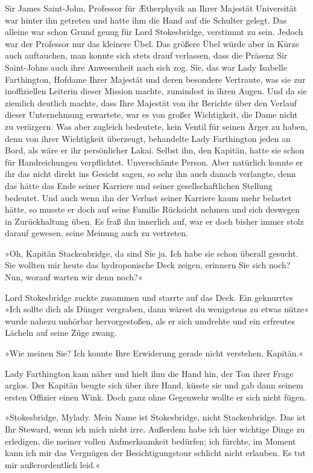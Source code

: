 Sir James Saint-John, Professor für Ætherphysik an Ihrer Majestät
Universität war hinter ihn getreten und hatte ihm die Hand auf die
Schulter gelegt. Das alleine war schon Grund genug für Lord
Stokesbridge, verstimmt zu sein. Jedoch war der Professor nur das
kleinere Übel. Das größere Übel würde aber in Kürze auch
auftauchen, man konnte sich stets drauf verlassen, dass die Präsenz
Sir Saint-Johns auch ihre Anwesenheit nach sich zog. Sie, das war
Lady Isabelle Farthington, Hofdame Ihrer Majestät und deren
besondere Vertraute, was sie zur inoffiziellen Leiterin dieser
Mission machte, zumindest in ihren Augen. Und da sie ziemlich
deutlich machte, dass Ihre Majestät von ihr Berichte über den
Verlauf dieser Unternehmung erwartete, war es von großer
Wichtigkeit, die Dame nicht zu verärgern. Was aber zugleich
bedeutete, kein Ventil für seinen Ärger zu haben, denn von ihrer
Wichtigkeit überzeugt, behandelte Lady Farthington jeden an Bord,
als wäre er ihr persönlicher Lakai. Selbst ihn, den Kapitän, hatte
sie schon für Handreichungen verpflichtet. Unverschämte Person.
Aber natürlich konnte er ihr das nicht direkt ins Gesicht sagen, so
sehr ihn auch danach verlangte, denn das hätte das Ende seiner
Karriere und seiner gesellschaftlichen Stellung bedeutet. Und auch
wenn ihn der Verlust seiner Karriere kaum mehr belastet hätte, so
musste er doch auf seine Familie Rücksicht nehmen und sich deswegen
in Zurückhaltung üben. Es fraß ihn innerlich auf, war er doch
bisher immer stolz darauf gewesen, seine Meinung auch zu
vertreten.

\bigpar

»Oh, Kapitän Stackenbridge, da sind Sie ja. Ich habe sie schon
überall gesucht. Sie wollten mir heute das hydroponische Deck
zeigen, erinnern Sie sich noch? Nun, worauf warten wir denn noch?«

Lord Stokesbridge zuckte zusammen und starrte auf das Deck. Ein
geknurrtes »Ich sollte dich als Dünger vergraben, dann wärest du
wenigstens zu etwas nütze« wurde nahezu unhörbar hervorgestoßen,
als er sich umdrehte und ein erfreutes Lächeln auf seine Züge
zwang.

»Wie meinen Sie? Ich konnte Ihre Erwiderung gerade nicht verstehen,
Kapitän.«

Lady Farthington kam näher und hielt ihm die Hand hin, der Ton
ihrer Frage arglos. Der Kapitän beugte sich über ihre Hand, küsste
sie und gab dann seinem ersten Offizier einen Wink. Doch ganz ohne
Gegenwehr wollte er sich nicht fügen.

»Stokesbridge, Mylady. Mein Name ist Stokesbridge, nicht
Stackenbridge. Das ist Ihr Steward, wenn ich mich nicht irre.
Außerdem habe ich hier wichtige Dinge zu erledigen, die meiner
vollen Aufmerksamkeit bedürfen; ich fürchte, im Moment kann ich mir
das Vergnügen der Besichtigungstour schlicht nicht erlauben. Es tut
mir außerordentlich leid.«

